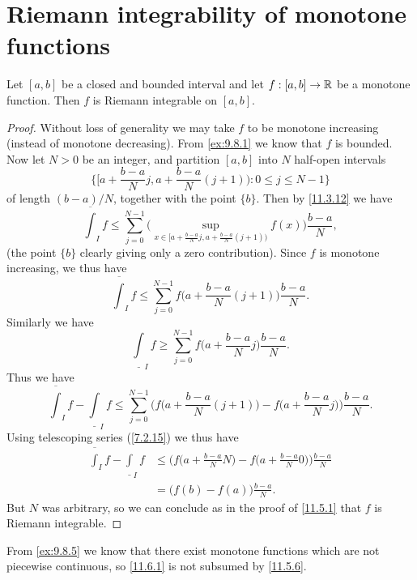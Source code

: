 \section{Riemann integrability of monotone functions}\label{sec:11.6}

\begin{prop}\label{11.6.1}
  Let \([a, b]\) be a closed and bounded interval and let \(f : [a, b] \to \mathbb{R}\) be a monotone function.
  Then \(f\) is Riemann integrable on \([a, b]\).
\end{prop}

\begin{proof}
  Without loss of generality we may take \(f\) to be monotone increasing (instead of monotone decreasing).
  From \cref{ex:9.8.1} we know that \(f\) is bounded.
  Now let \(N > 0\) be an integer, and partition \([a, b]\) into \(N\) half-open intervals
  \[
    \bigg\{\big[a + \frac{b - a}{N} j, a + \frac{b - a}{N} (j + 1)\big) : 0 \leq j \leq N - 1\bigg\}
  \]
  of length \((b - a) / N\), together with the point \(\{b\}\).
  Then by \cref{11.3.12} we have
  \[
    \overline{\int}_I f \leq \sum_{j = 0}^{N - 1} \Bigg(\sup_{x \in \big[a + \frac{b - a}{N} j, a + \frac{b - a}{N} (j + 1)\big)} f(x)\Bigg) \frac{b - a}{N},
  \]
  (the point \(\{b\}\) clearly giving only a zero contribution).
  Since \(f\) is monotone increasing, we thus have
  \[
    \overline{\int}_I f \leq \sum_{j = 0}^{N - 1} f\bigg(a + \frac{b - a}{N} (j + 1)\bigg) \frac{b - a}{N}.
  \]
  Similarly we have
  \[
    \underline{\int}_I f \geq \sum_{j = 0}^{N - 1} f\bigg(a + \frac{b - a}{N} j\bigg) \frac{b - a}{N}.
  \]
  Thus we have
  \[
    \overline{\int}_I f - \underline{\int}_I f \leq \sum_{j = 0}^{N - 1} \Bigg(f\bigg(a + \frac{b - a}{N} (j + 1)\bigg) - f\bigg(a + \frac{b - a}{N} j\bigg)\Bigg) \frac{b - a}{N}.
  \]
  Using telescoping series (\cref{7.2.15}) we thus have
  \begin{align*}
    \overline{\int}_I f - \underline{\int}_I f & \leq \Bigg(f\bigg(a + \frac{b - a}{N} N\bigg) - f\bigg(a + \frac{b - a}{N} 0\bigg)\Bigg) \frac{b - a}{N} \\
                                               & = \big(f(b) - f(a)\big) \frac{b - a}{N}.
  \end{align*}
  But \(N\) was arbitrary, so we can conclude as in the proof of \cref{11.5.1} that \(f\) is Riemann integrable.
\end{proof}

\begin{rmk}\label{11.6.2}
  From \cref{ex:9.8.5} we know that there exist monotone functions which are not piecewise continuous, so \cref{11.6.1} is not subsumed by \cref{11.5.6}.
\end{rmk}

